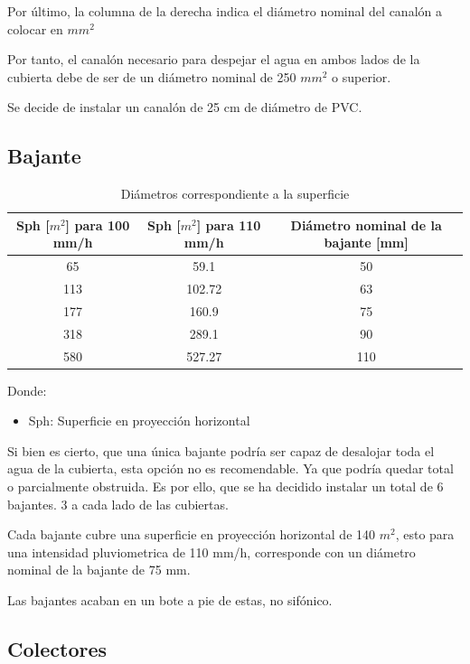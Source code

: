 \documentclass[../main.tex]{subfiles}
\begin{document}
Por último, la columna de la derecha indica el diámetro nominal del canalón a colocar en $mm^2$

Por tanto, el canalón necesario para despejar el agua en ambos lados de la cubierta debe de ser de un diámetro nominal de 250 $mm^2$ o superior. 

Se decide de instalar un canalón de 25 cm de diámetro de PVC. 

\subsection{Bajante}

\begin{table}[H]
    \centering
    \begin{tabular}{c|c|c}
    Sph [$m^2$] para 100 mm/h & Sph [$m^2$] para 110 mm/h & Diámetro nominal de la bajante [mm] \\ \hline
    65&59.1&50 \\
    113&102.72&63 \\
    177&160.9&75 \\
    318&289.1&90 \\
    580&527.27&110 \\
    \end{tabular}
    \caption{Diámetros correspondiente a la superficie}
\end{table}

Donde:

\begin{itemize}
    \item Sph: Superficie en proyección horizontal
\end{itemize}

Si bien es cierto, que una única bajante podría ser capaz de desalojar toda el agua de la cubierta, esta opción no es recomendable. Ya que podría quedar total o parcialmente obstruida. Es por ello, que se ha decidido instalar un total de 6 bajantes. 3 a cada lado de las cubiertas.

Cada bajante cubre una superficie en proyección horizontal de 140 $m^2$, esto para una intensidad pluviometrica de 110 mm/h, corresponde con un diámetro nominal de la bajante de 75 mm.

Las bajantes acaban en un bote a pie de estas, no sifónico.

\subsection{Colectores}
\end{document}
